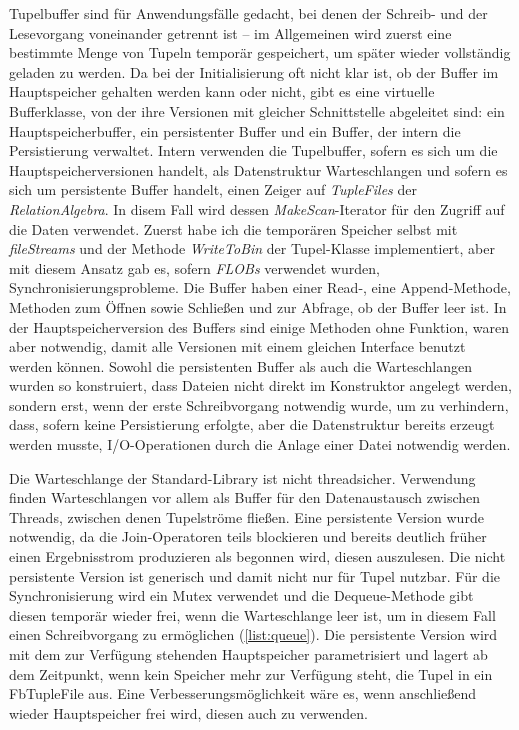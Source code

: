 \documentclass[a4paper,12pt,twoside]{article}
\newcommand{\Fb}[1]{\textit{#1}} %
\begin{document}
Tupelbuffer sind für Anwendungsfälle gedacht, bei denen der Schreib- und der Lesevorgang voneinander getrennt ist -- im Allgemeinen wird zuerst eine bestimmte Menge von Tupeln temporär gespeichert, um später wieder vollständig geladen zu werden. Da bei der Initialisierung oft nicht klar ist, ob der Buffer im Hauptspeicher gehalten werden kann oder nicht, gibt es eine virtuelle Bufferklasse, von der ihre Versionen mit gleicher Schnittstelle abgeleitet sind: ein Hauptspeicherbuffer, ein persistenter Buffer und ein Buffer, der intern die Persistierung verwaltet. Intern verwenden die Tupelbuffer, sofern es sich um die Hauptspeicherversionen handelt, als Datenstruktur Warteschlangen und sofern es sich um persistente Buffer handelt, einen Zeiger auf \Fb{TupleFiles} der \Fb{RelationAlgebra}. In disem Fall wird dessen \Fb{MakeScan}-Iterator für den Zugriff auf die Daten verwendet. Zuerst habe ich die temporären Speicher selbst mit \Fb{fileStreams} und der Methode \Fb{WriteToBin} der Tupel-Klasse implementiert, aber mit diesem Ansatz gab es, sofern \Fb{FLOBs} verwendet wurden, Synchronisierungsprobleme. Die Buffer haben einer Read-, eine Append-Methode, Methoden zum Öffnen sowie Schließen und zur Abfrage, ob der Buffer leer ist. In der Hauptspeicherversion des Buffers sind einige Methoden ohne Funktion, waren aber notwendig, damit alle Versionen mit einem gleichen Interface benutzt werden können. Sowohl die persistenten Buffer als auch die Warteschlangen wurden so konstruiert, dass Dateien nicht direkt im Konstruktor angelegt werden, sondern erst, wenn der erste Schreibvorgang notwendig wurde, um zu verhindern, dass, sofern keine Persistierung erfolgte, aber die Datenstruktur bereits erzeugt werden musste, I/O-Operationen durch die Anlage einer Datei notwendig werden.

Die Warteschlange der Standard-Library ist nicht threadsicher. Verwendung finden Warteschlangen vor allem als Buffer für den Datenaustausch zwischen Threads, zwischen denen Tupelströme fließen. Eine persistente Version wurde notwendig, da die Join-Operatoren teils blockieren und bereits deutlich früher einen Ergebnisstrom produzieren als begonnen wird, diesen auszulesen. Die nicht persistente Version ist generisch und damit nicht nur für Tupel nutzbar. Für die Synchronisierung wird ein Mutex verwendet und die Dequeue-Methode gibt diesen temporär wieder frei, wenn die Warteschlange leer ist, um in diesem Fall einen Schreibvorgang zu ermöglichen (\autoref{list:queue}). Die persistente Version wird mit dem zur Verfügung stehenden Hauptspeicher parametrisiert und lagert ab dem Zeitpunkt, wenn kein Speicher mehr zur Verfügung steht, die Tupel in ein Fb{TupleFile} aus. Eine Verbesserungsmöglichkeit wäre es, wenn anschließend wieder Hauptspeicher frei wird, diesen auch zu verwenden.
\end{document}
